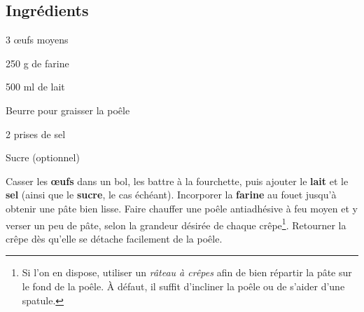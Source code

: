 \newpage
{}

\subsection*{Ingrédients}
\begin{ingredients}
	\item 3 \oe ufs moyens
	\item 250 g de farine
	\item 500 ml de lait
	\item Beurre pour graisser la poêle
	\item 2 prises de sel
	\item Sucre (optionnel)
\end{ingredients}

\medskip

Casser les \textbf{\oe ufs} dans un bol, les battre à la fourchette, puis ajouter le \textbf{lait} et le \textbf{sel} (ainsi que le \textbf{sucre}, le cas échéant).
Incorporer la \textbf{farine} au fouet jusqu'à obtenir une pâte bien lisse.
Faire chauffer une poêle antiadhésive à feu moyen et y verser un peu de pâte, selon la grandeur désirée de chaque crêpe\footnote{Si l'on en dispose, utiliser un \textit{râteau à crêpes} afin de bien répartir la pâte sur le fond de la poêle. À défaut, il suffit d'incliner la poêle ou de s'aider d'une spatule.}. 
Retourner la crêpe dès qu'elle se détache facilement de la poêle.


\vspace*{0.75 cm}

\begin{recipeblock}
	\noindent 
\end{recipeblock}